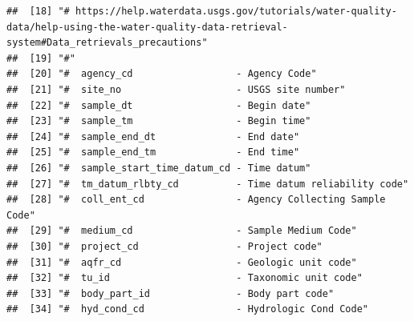 \documentclass[
]{book}
\begin{document}
\begin{verbatim}
##  [18] "# https://help.waterdata.usgs.gov/tutorials/water-quality-data/help-using-the-water-quality-data-retrieval-system#Data_retrievals_precautions"
##  [19] "#"                                                                                                                                            
##  [20] "#  agency_cd                  - Agency Code"                                                                                                  
##  [21] "#  site_no                    - USGS site number"                                                                                             
##  [22] "#  sample_dt                  - Begin date"                                                                                                   
##  [23] "#  sample_tm                  - Begin time"                                                                                                   
##  [24] "#  sample_end_dt              - End date"                                                                                                     
##  [25] "#  sample_end_tm              - End time"                                                                                                     
##  [26] "#  sample_start_time_datum_cd - Time datum"                                                                                                   
##  [27] "#  tm_datum_rlbty_cd          - Time datum reliability code"                                                                                  
##  [28] "#  coll_ent_cd                - Agency Collecting Sample Code"                                                                                
##  [29] "#  medium_cd                  - Sample Medium Code"                                                                                           
##  [30] "#  project_cd                 - Project code"                                                                                                 
##  [31] "#  aqfr_cd                    - Geologic unit code"                                                                                           
##  [32] "#  tu_id                      - Taxonomic unit code"                                                                                          
##  [33] "#  body_part_id               - Body part code"                                                                                               
##  [34] "#  hyd_cond_cd                - Hydrologic Cond Code"                                                                                         

\end{verbatim}
\end{document}
